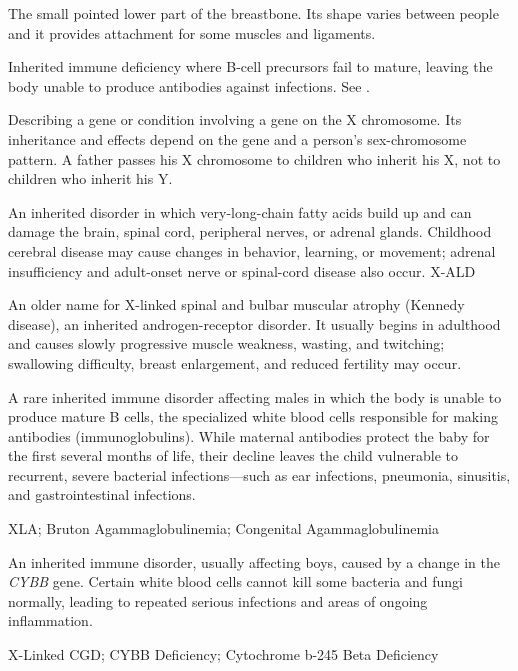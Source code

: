  The small pointed lower part of the breastbone. Its shape varies between people and it provides attachment for some muscles and ligaments.

 Inherited immune deficiency where B-cell precursors fail to mature, leaving the body unable to produce antibodies against infections. See .

 Describing a gene or condition involving a gene on the X chromosome. Its inheritance and effects depend on the gene and a person's sex-chromosome pattern. A father passes his X chromosome to children who inherit his X, not to children who inherit his Y.

 An inherited disorder in which very-long-chain fatty acids build up and can damage the brain, spinal cord, peripheral nerves, or adrenal glands. Childhood cerebral disease may cause changes in behavior, learning, or movement; adrenal insufficiency and adult-onset nerve or spinal-cord disease also occur.
\synonyms
X-ALD

 An older name for X-linked spinal and bulbar muscular atrophy (Kennedy disease), an inherited androgen-receptor disorder. It usually begins in adulthood and causes slowly progressive muscle weakness, wasting, and twitching; swallowing difficulty, breast enlargement, and reduced fertility may occur.

 A rare inherited immune disorder affecting males in which the body is unable to produce mature B cells, the specialized white blood cells responsible for making antibodies (immunoglobulins). While maternal antibodies protect the baby for the first several months of life, their decline leaves the child vulnerable to recurrent, severe bacterial infections---such as ear infections, pneumonia, sinusitis, and gastrointestinal infections.

\synonyms
XLA; Bruton Agammaglobulinemia; Congenital Agammaglobulinemia

 An inherited immune disorder, usually affecting boys, caused by a change in the \textit{CYBB} gene. Certain white blood cells cannot kill some bacteria and fungi normally, leading to repeated serious infections and areas of ongoing inflammation.

\synonyms
X-Linked CGD; CYBB Deficiency; Cytochrome b-245 Beta Deficiency


